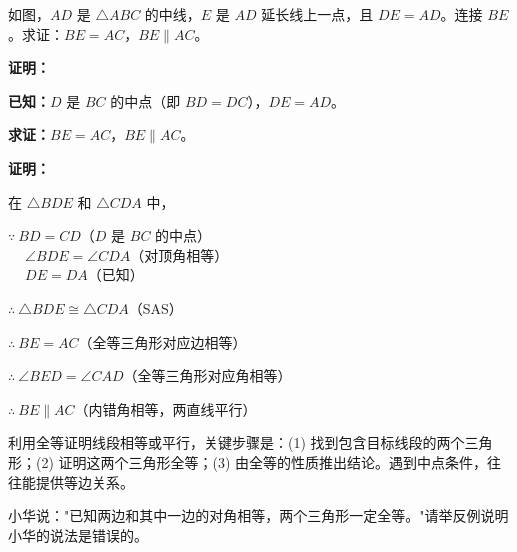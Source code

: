 \documentclass[12pt, a4paper]{ctexart}
\begin{document}
\begin{examplebox}
如图，$AD$ 是 $\triangle ABC$ 的中线，$E$ 是 $AD$ 延长线上一点，且 $DE = AD$。连接 $BE$。求证：$BE = AC$，$BE \parallel AC$。

\begin{center}
\end{center}
\end{examplebox}

\textbf{证明：}

\textbf{已知：}$D$ 是 $BC$ 的中点（即 $BD = DC$），$DE = AD$。

\textbf{求证：}$BE = AC$，$BE \parallel AC$。

\textbf{证明：}

在 $\triangle BDE$ 和 $\triangle CDA$ 中，

$\because\ BD = CD$（$D$ 是 $BC$ 的中点）\\
$\quad\ \angle BDE = \angle CDA$（对顶角相等）\\
$\quad\ DE = DA$（已知）

$\therefore\ \triangle BDE \cong \triangle CDA$（SAS）

$\therefore\ BE = AC$（全等三角形对应边相等）

$\therefore\ \angle BED = \angle CAD$（全等三角形对应角相等）

$\therefore\ BE \parallel AC$（内错角相等，两直线平行）

\begin{tipbox}[方法总结]
利用全等证明线段相等或平行，关键步骤是：(1) 找到包含目标线段的两个三角形；(2) 证明这两个三角形全等；(3) 由全等的性质推出结论。遇到中点条件，往往能提供等边关系。
\end{tipbox}

\begin{examplebox}
小华说："已知两边和其中一边的对角相等，两个三角形一定全等。"请举反例说明小华的说法是错误的。
\end{examplebox}
\end{document}
